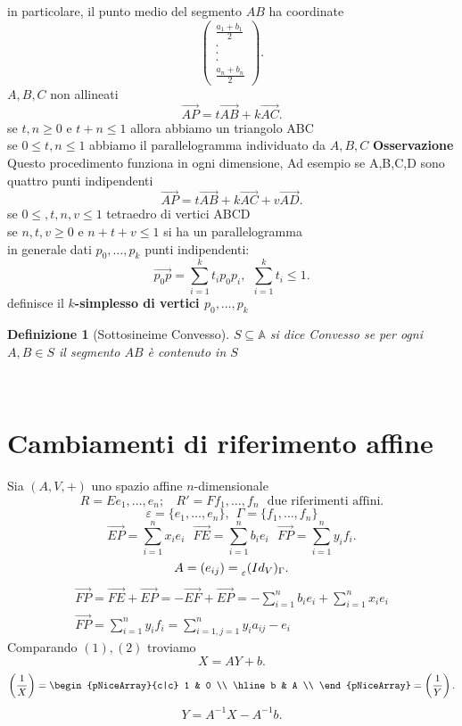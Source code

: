 \documentclass[12px]{article}
\theoremstyle{break}
\theoremstyle{break}
\theoremstyle{break}
\newtheorem{defin}{Definizione}
\theoremstyle{break}
\theoremstyle{break}
\theoremstyle{break}
\theoremstyle{breal}
\newenvironment{defi}
{\begin{mdframed}[linecolor=orange, backgroundcolor=orange!10]\begin{defin}}
  {\end{defin}\end{mdframed}}
\newcommand{\icol}[1]{%
  \left(\begin{smallmatrix}#1\end{smallmatrix}\right)%
}
\begin{document}
	in particolare, il punto medio del segmento $AB$ ha coordinate
	\[
		\icol{\frac{a_1+b_1}{2}\\.\\.\\.\\\frac{a_n + b_n}{2}}
	.\] 
	$A,B,C$ non allineati
	\[
	\overrightarrow{AP} = t\overrightarrow{AB} + k\overrightarrow{AC}
	.\] 
	se $t,n \geq 0$ e $t + n\leq 1$ allora abbiamo un triangolo ABC\\
	se $0\leq t,n \leq 1$ abbiamo il parallelogramma individuato da $A,B,C$\newpage
	\textbf{Osservazione}\\
	Questo procedimento funziona in ogni dimensione, Ad esempio se A,B,C,D sono quattro punti indipendenti
	\[
	\overrightarrow{AP} = t\overrightarrow{AB} + k\overrightarrow{AC} + v\overrightarrow{AD}
	.\] 
	se $0\leq,t,n,v\leq 1$ tetraedro di vertici ABCD\\
	se $n,t,v\geq 0$ e $n+t+v\leq 1$ si ha un parallelogramma\\
	in generale dati $p_0,\ldots,p_k$ punti indipendenti:\\
	\[
	\overrightarrow{p_0p} = \sum^k_{i=1}t_ip_0p_i, \ \ \sum^k_{i=1}t_i \leq 1
	.\] 
	definisce il \textbf{$k$-simplesso di vertici $p_0,\ldots,p_k$}\\
	\begin{defi}[Sottosineime Convesso]
	$S\subseteq \mathbb{A} $ si dice Convesso se per ogni $A,B\in S$ il segmento $AB$ è contenuto in $S$
\end{defi}
\
\section{Cambiamenti di riferimento affine}
Sia $(A,V,+)$ uno spazio affine $n$-dimensionale
\[
	R = Ee_1,\ldots,e_n;\ \ \ \ R'= Ff_1,\ldots,f_n \ \ \ \text{due riferimenti affini}
.\] 
\[
	\varepsilon = \{e_1,\ldots,e_n\}, \ \ \Gamma = \{f_1,\ldots,f_n\}
\]
\[
\overrightarrow{EP} = \sum^n_{i=1}x_ie_i\ \ \ \overrightarrow{FE} = \sum^n_{i=1}b_ie_i \ \ \ \overrightarrow{FP} = \sum^n_{i=1}y_if_i
.\] 
\[
	A = (e_{ij}) = \prescript{}{\varepsilon}{(Id_V)}_\Gamma
.\] 
\begin{gather}
\overrightarrow{FP} = \overrightarrow{FE} + \overrightarrow{EP} = -\overrightarrow{EF} + \overrightarrow{EP} = -\sum^n_{i=1}b_ie_i + \sum^n_{i=1}x_ie_i\\
\overrightarrow{FP} = \sum^n_{i=1}y_if_i = \sum^n_{i=1, j=1}y_ia_{ij}-e_i
\end{gather}
Comparando $(1),(2)$ troviamo \[
X = AY + b
.\] 
\[
	\left(\frac{1}{X}\right) = \begin{pNiceArray}{c|c}
		1 & 0 \\
		\hline
		b & A \\ 
	\end{pNiceArray} = \left(\frac{1}{Y}\right)
.\] 
\[
	Y = A^{-1}X - A^{-1}b
.\] 
\end{document}
